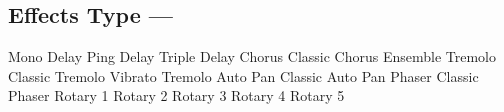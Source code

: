 \subsection[Effects Type]{Effects Type --- \UiKey{\SET}}









































Mono Delay
Ping Delay
Triple Delay
Chorus
Classic Chorus
Ensemble
Tremolo
Classic Tremolo
Vibrato Tremolo
Auto Pan
Classic Auto Pan
Phaser
Classic Phaser
Rotary 1
Rotary 2
Rotary 3
Rotary 4
Rotary 5
